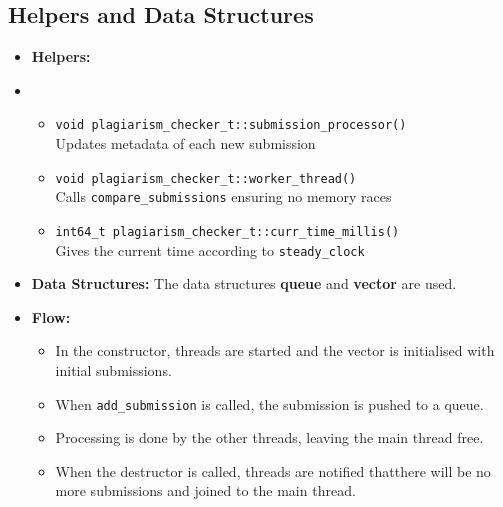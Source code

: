 \documentclass[12pt]{article}
\begin{document}
\subsection{Helpers and Data Structures}
\begin{itemize}[noitemsep]
    \item \textbf{Helpers:}
    \item \begin{itemize}
        \item \texttt{void plagiarism\_checker\_t::submission\_processor()} \\
        Updates metadata of each new submission
        \item \texttt{void plagiarism\_checker\_t::worker\_thread()} \\
        Calls \texttt{compare\_submissions} ensuring no memory races
        \item \texttt{int64\_t plagiarism\_checker\_t::curr\_time\_millis()} \\
        Gives the current time according to \texttt{steady\_clock}
    \end{itemize}
    \item \textbf{Data Structures:} The data structures \textbf{queue} and \textbf{vector} are used.
    \item \textbf{Flow:} 
    \begin{itemize}
        \item In the constructor, threads are started and the vector is initialised with initial submissions.
        \item When \texttt{add\_submission} is called, the submission is pushed to a queue.
        \item Processing is done by the other threads, leaving the main thread free.
        \item When the destructor is called, threads are notified thatthere will be no more submissions and joined to the main thread.
    \end{itemize}
\end{itemize}
\end{document}

